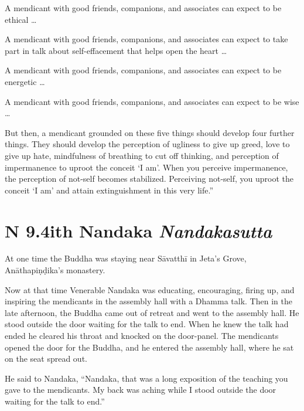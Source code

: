\documentclass[12pt,openany]{book}%
\newcommand*{\suttatitleacronym}[1]{\smaller[2]{#1}\vspace*{.3em}}
\newcommand*{\suttatitletranslation}[1]{\linebreak{#1}}
\newcommand*{\suttatitleroot}[1]{\linebreak\smaller[2]\itshape{#1}}
\newcommand*{\tocacronym}[1]{\hspace*{-3.3em}{#1}\quad}
\newcommand*{\toctranslation}[1]{#1}
\newcommand*{\tocroot}[1]{(\textit{#1})}
\begin{document}
A mendicant with good friends, companions, and associates can expect to be ethical … 

A mendicant with good friends, companions, and associates can expect to take part in talk about self-effacement that helps open the heart … 

A mendicant with good friends, companions, and associates can expect to be energetic … 

A mendicant with good friends, companions, and associates can expect to be wise … 

But then, a mendicant grounded on these five things should develop four further things. They should develop the perception of ugliness to give up greed, love to give up hate, mindfulness of breathing to cut off thinking, and perception of impermanence to uproot the conceit ‘I am’. When you perceive impermanence, the perception of not-self becomes stabilized. Perceiving not-self, you uproot the conceit ‘I am’ and attain extinguishment in this very life.” 

%
\section*{{\suttatitleacronym AN 9.4}{\suttatitletranslation With Nandaka }{\suttatitleroot Nandakasutta}}
\addcontentsline{toc}{section}{\tocacronym{AN 9.4} \toctranslation{With Nandaka } \tocroot{Nandakasutta}}

At one time the Buddha was staying near \textsanskrit{Sāvatthī} in Jeta’s Grove, \textsanskrit{Anāthapiṇḍika}’s monastery. 

Now at that time Venerable Nandaka was educating, encouraging, firing up, and inspiring the mendicants in the assembly hall with a Dhamma talk. Then in the late afternoon, the Buddha came out of retreat and went to the assembly hall. He stood outside the door waiting for the talk to end. When he knew the talk had ended he cleared his throat and knocked on the door-panel. The mendicants opened the door for the Buddha, and he entered the assembly hall, where he sat on the seat spread out. 

He said to Nandaka, “Nandaka, that was a long exposition of the teaching you gave to the mendicants. My back was aching while I stood outside the door waiting for the talk to end.” 
\end{document}
